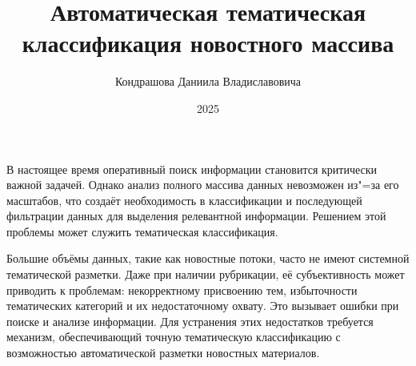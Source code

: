\documentclass[autoref]{SCWorks}
\begin{document}

\title{Автоматическая тематическая классификация новостного массива}





\author{Кондрашова Даниила Владиславовича}




\date{2025}
\maketitle
\secNumbering
\intro
В настоящее время оперативный поиск информации становится критически важной
задачей. Однако анализ полного массива данных невозможен из"=за его масштабов,
что создаёт необходимость в классификации и последующей фильтрации данных для
выделения релевантной информации. Решением этой проблемы может служить
тематическая классификация.

Большие объёмы данных, такие как новостные потоки, часто не имеют системной
тематической разметки. Даже при наличии рубрикации, её субъективность может
приводить к проблемам: некорректному присвоению тем, избыточности тематических
категорий и их недостаточному охвату. Это вызывает ошибки при поиске и анализе
информации. Для устранения этих недостатков требуется механизм, обеспечивающий
точную тематическую классификацию с возможностью автоматической разметки
новостных материалов.
\end{document}
